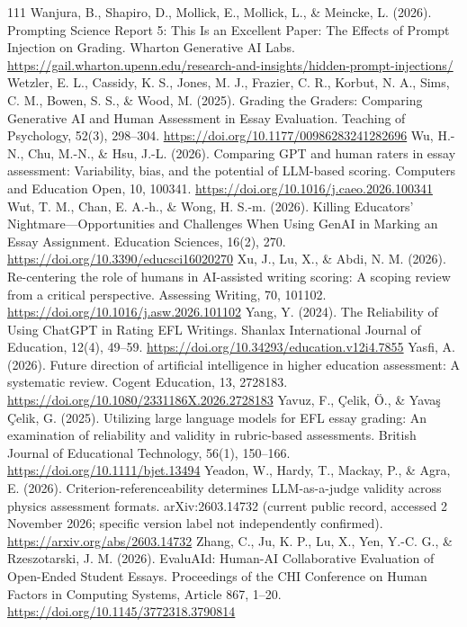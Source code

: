 \begin{thebibliography}{111}
 Wanjura, B., Shapiro, D., Mollick, E., Mollick, L., \& Meincke, L. (2026). Prompting Science Report 5: This Is an Excellent Paper: The Effects of Prompt Injection on Grading. Wharton Generative AI Labs. \url{https://gail.wharton.upenn.edu/research-and-insights/hidden-prompt-injections/}
 Wetzler, E. L., Cassidy, K. S., Jones, M. J., Frazier, C. R., Korbut, N. A., Sims, C. M., Bowen, S. S., \& Wood, M. (2025). Grading the Graders: Comparing Generative AI and Human Assessment in Essay Evaluation. Teaching of Psychology, 52(3), 298--304. \url{https://doi.org/10.1177/00986283241282696}
 Wu, H.-N., Chu, M.-N., \& Hsu, J.-L. (2026). Comparing GPT and human raters in essay assessment: Variability, bias, and the potential of LLM-based scoring. Computers and Education Open, 10, 100341. \url{https://doi.org/10.1016/j.caeo.2026.100341}
 Wut, T. M., Chan, E. A.-h., \& Wong, H. S.-m. (2026). Killing Educators' Nightmare---Opportunities and Challenges When Using GenAI in Marking an Essay Assignment. Education Sciences, 16(2), 270. \url{https://doi.org/10.3390/educsci16020270}
 Xu, J., Lu, X., \& Abdi, N. M. (2026). Re-centering the role of humans in AI-assisted writing scoring: A scoping review from a critical perspective. Assessing Writing, 70, 101102. \url{https://doi.org/10.1016/j.asw.2026.101102}
 Yang, Y. (2024). The Reliability of Using ChatGPT in Rating EFL Writings. Shanlax International Journal of Education, 12(4), 49--59. \url{https://doi.org/10.34293/education.v12i4.7855}
 Yasfi, A. (2026). Future direction of artificial intelligence in higher education assessment: A systematic review. Cogent Education, 13, 2728183. \url{https://doi.org/10.1080/2331186X.2026.2728183}
 Yavuz, F., \c{C}elik, \"{O}., \& Yava\c{s} \c{C}elik, G. (2025). Utilizing large language models for EFL essay grading: An examination of reliability and validity in rubric-based assessments. British Journal of Educational Technology, 56(1), 150--166. \url{https://doi.org/10.1111/bjet.13494}
 Yeadon, W., Hardy, T., Mackay, P., \& Agra, E. (2026). Criterion-referenceability determines LLM-as-a-judge validity across physics assessment formats. arXiv:2603.14732 (current public record, accessed 2 November 2026; specific version label not independently confirmed). \url{https://arxiv.org/abs/2603.14732}
 Zhang, C., Ju, K. P., Lu, X., Yen, Y.-C. G., \& Rzeszotarski, J. M. (2026). EvaluAId: Human-AI Collaborative Evaluation of Open-Ended Student Essays. Proceedings of the CHI Conference on Human Factors in Computing Systems, Article 867, 1--20. \url{https://doi.org/10.1145/3772318.3790814}

\end{thebibliography}
